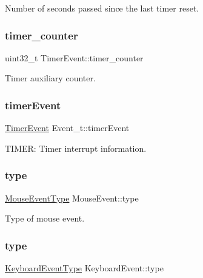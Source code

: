 Number of seconds passed since the last timer reset. 

\mbox{\label{group__event_ga9172712556eddc4759318d2b2c527c6a}} 
\subsubsection{\texorpdfstring{timer\+\_\+counter}{timer\_counter}}
{\footnotesize\ttfamily uint32\+\_\+t Timer\+Event\+::timer\+\_\+counter}



Timer auxiliary counter. 

\mbox{\label{group__event_ga00faceeda48c11ab73d93386410fb947}} 
\subsubsection{\texorpdfstring{timer\+Event}{timerEvent}}
{\footnotesize\ttfamily \mbox{\hyperlink{struct_timer_event}{Timer\+Event}} Event\+\_\+t\+::timer\+Event}



T\+I\+M\+ER\+: Timer interrupt information. 

\mbox{\label{group__event_ga44b4240ab9b63b86e68d3e0ba4b64407}} 
\subsubsection{\texorpdfstring{type}{type}\hspace{0.1cm}{\footnotesize\ttfamily [1/2]}}
{\footnotesize\ttfamily \mbox{\hyperlink{group__event_ga262cb54ad20544f03867d1962cdf9ec9}{Mouse\+Event\+Type}} Mouse\+Event\+::type}



Type of mouse event. 

\mbox{\label{group__event_ga88ca71424bb0d59efe2a10e65cdb52f0}} 
\subsubsection{\texorpdfstring{type}{type}\hspace{0.1cm}{\footnotesize\ttfamily [2/2]}}
{\footnotesize\ttfamily \mbox{\hyperlink{group__event_ga65afc57ec37493fc7409f26a189ab104}{Keyboard\+Event\+Type}} Keyboard\+Event\+::type}



